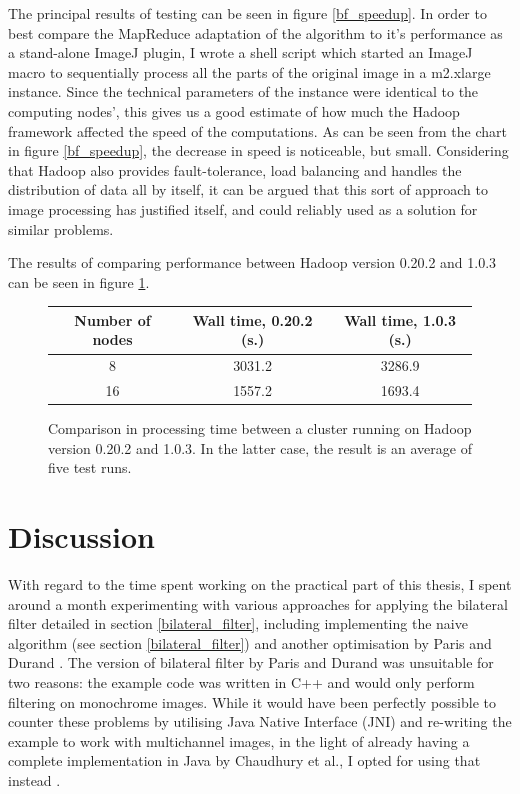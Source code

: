 \documentclass [12pt,a4paper]{report}
\begin{document}
The principal results of testing can be seen in figure \ref{bf_speedup}. In order to best compare the MapReduce adaptation of the algorithm to it's performance as a stand-alone ImageJ plugin, I wrote a shell script which started an ImageJ macro to sequentially process all the parts of the original image in a m2.xlarge instance. Since the technical parameters of the instance were identical to the computing nodes', this gives us a good estimate of how much the Hadoop framework affected the speed of the computations. As can be seen from the chart in figure \ref{bf_speedup}, the decrease in speed is noticeable, but small. Considering that Hadoop also provides fault-tolerance, load balancing and handles the distribution of data all by itself, it can be argued that this sort of approach to image processing has justified itself, and could reliably used as a solution for similar problems.

The results of comparing performance between Hadoop version 0.20.2 and 1.0.3 can be seen in figure \ref{fig_hadoop_version_compare}.

\begin{figure}[h]
\begin{center}
\begin{tabular}{c | c | c}
Number of nodes & Wall time, 0.20.2 (s.) & Wall time, 1.0.3 (s.) \\ 
\hline
8 & 3031.2 & 3286.9 \\
16 & 1557.2 & 1693.4 \\
\end{tabular}
\caption[Comparison between Hadoop 0.20.2 and 1.0.3]{Comparison in processing time between a cluster running on Hadoop version 0.20.2 and 1.0.3. In the latter case, the result is an average of five test runs.}
\label{fig_hadoop_version_compare}
\end{center}
\end{figure}

\section{Discussion}

With regard to the time spent working on the practical part of this thesis, I spent around a month experimenting with various approaches for applying the bilateral filter detailed in section \ref{bilateral_filter}, including implementing the naive algorithm (see section \ref{bilateral_filter}) and another optimisation by Paris and Durand \cite{paris2006fast}. The version of bilateral filter by Paris and Durand was unsuitable for two reasons: the example code was written in C++ and would only perform filtering on monochrome images. While it would have been perfectly possible to counter these problems by utilising Java Native Interface (JNI) and re-writing the example to work with multichannel images, in the light of already having a complete implementation in Java by Chaudhury et al., I opted for using that instead \cite{jni}.
\end{document}
